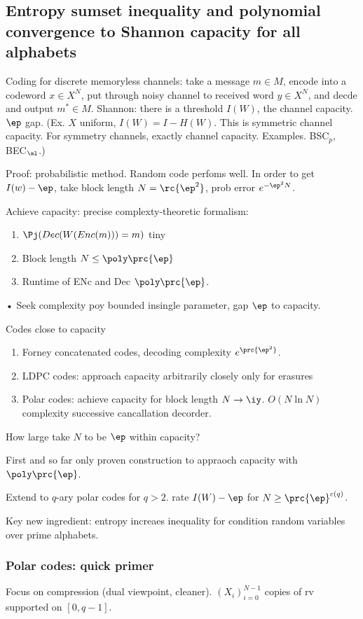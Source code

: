 \subsection{Entropy sumset inequality and polynomial convergence to Shannon capacity for all alphabets}

Coding for discrete memoryless channels: take a message $m\in M$, encode into a codeword $x\in X^N$, put through noisy channel to received word $y\in X^N$, and decde and output $m^*\in M$. Shannon: there is a threshold $I(W)$, the channel capacity. $\ep$ gap. (Ex. $X$ uniform, $I(W)=I-H(W)$. This is symmetric channel capacity. For symmetry channels, exactly channel capacity. Examples. BSC${}_p$, BEC${}_\al$.)

Proof: probabilistic method. Random code perfoms well. In order to get $I(w)-\ep$, take block length $N=\rc{\ep^2}$, prob error $e^{-\ep^2N}$.

Achieve capacity: precise complexty-theoretic formalism:
\begin{enumerate}
\item
$\Pj(Dec(W(Enc(m)))=m)$ tiny
\item
Block length $N\le \poly\prc{\ep}$
\item
Runtime of ENc and Dec $\poly\prc{\ep}$.
\end{enumerate}•
Seek complexity poy bounded insingle parameter, gap $\ep$ to capacity.

Codes close to capacity
\begin{enumerate}
\item
Forney concatenated codes, decoding complexity $e^{\prc{\ep^2}}$. 
\item
LDPC codes: approach capacity arbitrarily closely only for erasures
\item
Polar codes: achieve capacity for block length $N\to \iy$. $O(N\ln N)$ complexity successive cancallation decorder.
\end{enumerate}
How large take $N$ to be $\ep$ within capacity? 

First and so far only proven construction to appraoch capacity with $\poly\prc{\ep}$.

Extend to $q$-ary polar codes for $q>2$. rate $I(W)-\ep$ for $N\ge \prc{\ep}^{c(q)}$. 

Key new ingredient: entropy increaes inequality for condition random variables over prime alphabets.

\subsubsection{Polar codes: quick primer}
Focus on compression (dual viewpoint, cleaner).
$(X_i)_{i=0}^{N-1}$ copies of rv supported on $[0,q-1]$. 

